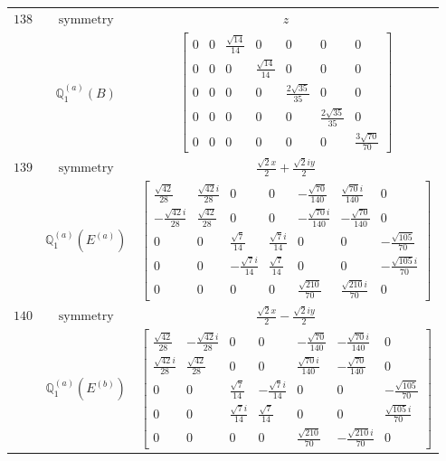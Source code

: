 \documentclass[fleqn,8pt,landscape]{jsarticle}
\begin{document}
\begin{longtable}{ccc}
$ 138 $ & $ \text{symmetry} $ & $ z $ \\
$  $ & $ \mathbb{Q}_{1}^{(a)}(B) $ & $ \begin{bmatrix} 0 & 0 & \frac{\sqrt{14}}{14} & 0 & 0 & 0 & 0 \\ 0 & 0 & 0 & \frac{\sqrt{14}}{14} & 0 & 0 & 0 \\ 0 & 0 & 0 & 0 & \frac{2 \sqrt{35}}{35} & 0 & 0 \\ 0 & 0 & 0 & 0 & 0 & \frac{2 \sqrt{35}}{35} & 0 \\ 0 & 0 & 0 & 0 & 0 & 0 & \frac{3 \sqrt{70}}{70} \end{bmatrix} $ \\ \hline
$ 139 $ & $ \text{symmetry} $ & $ \frac{\sqrt{2} x}{2} + \frac{\sqrt{2} i y}{2} $ \\
$  $ & $ \mathbb{Q}_{1}^{(a)}(E^{(a)}) $ & $ \begin{bmatrix} \frac{\sqrt{42}}{28} & \frac{\sqrt{42} i}{28} & 0 & 0 & - \frac{\sqrt{70}}{140} & \frac{\sqrt{70} i}{140} & 0 \\ - \frac{\sqrt{42} i}{28} & \frac{\sqrt{42}}{28} & 0 & 0 & - \frac{\sqrt{70} i}{140} & - \frac{\sqrt{70}}{140} & 0 \\ 0 & 0 & \frac{\sqrt{7}}{14} & \frac{\sqrt{7} i}{14} & 0 & 0 & - \frac{\sqrt{105}}{70} \\ 0 & 0 & - \frac{\sqrt{7} i}{14} & \frac{\sqrt{7}}{14} & 0 & 0 & - \frac{\sqrt{105} i}{70} \\ 0 & 0 & 0 & 0 & \frac{\sqrt{210}}{70} & \frac{\sqrt{210} i}{70} & 0 \end{bmatrix} $ \\ \hline
$ 140 $ & $ \text{symmetry} $ & $ \frac{\sqrt{2} x}{2} - \frac{\sqrt{2} i y}{2} $ \\
$  $ & $ \mathbb{Q}_{1}^{(a)}(E^{(b)}) $ & $ \begin{bmatrix} \frac{\sqrt{42}}{28} & - \frac{\sqrt{42} i}{28} & 0 & 0 & - \frac{\sqrt{70}}{140} & - \frac{\sqrt{70} i}{140} & 0 \\ \frac{\sqrt{42} i}{28} & \frac{\sqrt{42}}{28} & 0 & 0 & \frac{\sqrt{70} i}{140} & - \frac{\sqrt{70}}{140} & 0 \\ 0 & 0 & \frac{\sqrt{7}}{14} & - \frac{\sqrt{7} i}{14} & 0 & 0 & - \frac{\sqrt{105}}{70} \\ 0 & 0 & \frac{\sqrt{7} i}{14} & \frac{\sqrt{7}}{14} & 0 & 0 & \frac{\sqrt{105} i}{70} \\ 0 & 0 & 0 & 0 & \frac{\sqrt{210}}{70} & - \frac{\sqrt{210} i}{70} & 0 \end{bmatrix} $ \\ \hline

\end{longtable}
\end{document}
